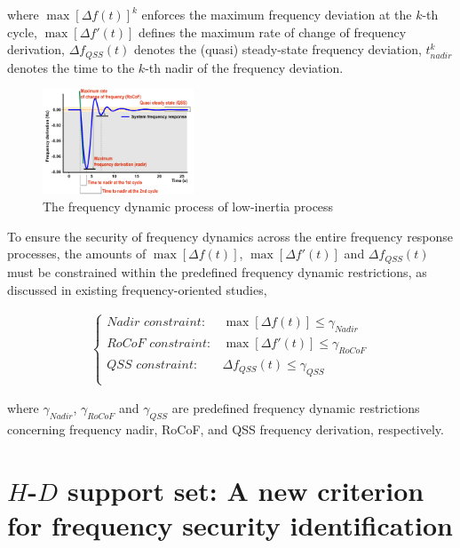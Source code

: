 \documentclass[lettersize,journal]{IEEEtran}
\begin{document}
\noindent
where $\max [\varDelta f(t)]^k$ enforces the maximum frequency deviation at the $k$-th cycle, $\max [\varDelta f'(t)]$ defines the maximum rate of change of frequency derivation, $\varDelta f_{QSS} (t)$ denotes the (quasi) steady-state frequency deviation, $t_{nadir}^k$ denotes the time to the $k$-th nadir of the frequency deviation.

\begin{figure}[h]
  \centering
  \includegraphics[width=0.4\textwidth]{frequency_response.pdf}
  \caption{The frequency dynamic process of low-inertia process}\vspace{-0.125cm}
  \label{fig:sfr}
\end{figure}

To ensure the security of frequency dynamics across the entire frequency response processes, the amounts of $\max[\varDelta f(t)]$, $\max[\varDelta f'(t)]$ and $\varDelta f_{QSS}(t)$ must be constrained within the predefined frequency dynamic restrictions, as discussed in existing frequency-oriented studies,

\begin{subequations}
  \begin{align}
  \left \{
  \begin{array}{rr}
  {Nadir\,\, constraint:}& \max[\varDelta f (t)] \leq \gamma_{Nadir}\\
  {RoCoF\,\, constraint:}&\max[\varDelta f' (t)] \leq \gamma_{RoCoF}\\
  {QSS\,\, constraint:} &\varDelta f_{QSS} (t) \leq \gamma_{QSS}\\
\end{array}
\right.
    \end{align}
  \end{subequations}

  \noindent
where $\gamma_{Nadir}$, $\gamma_{RoCoF}$ and $\gamma_{QSS}$ are predefined frequency dynamic restrictions concerning frequency nadir, RoCoF, and QSS frequency derivation, respectively.

\section{$H$-$D$ support set: A new criterion for frequency security identification}  
\end{document}
